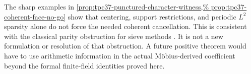 The sharp examples in
\cref{prop:tpc37-punctured-character-witness,%
prop:tpc37-coherent-face-no-go} show that centering, support restrictions,
and periodic \(L^2\) sparsity alone do not force the needed coherent
cancellation.  This is consistent with the classical parity obstruction
for sieve methods \citep{HeathBrown1982Parity,IwaniecKowalski2004}.
It is not a new formulation or resolution of that obstruction.  A future
positive theorem would have to use arithmetic information in the actual
M\"obius-derived coefficient beyond the formal finite-field identities
proved here.
